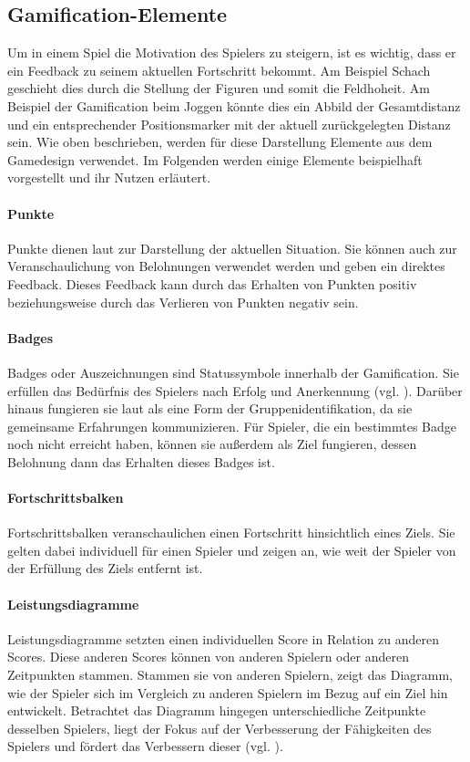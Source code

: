 \documentclass[
	oneside,  %
	ngerman, 
	final, 
	11pt, 
	a4paper, 
	1.1headlines, 
	headinclude=false, 
	footinclude=false, 
	mpinclude=false, 
	pagesize, 
	onecolumn, 
	titlepage, 
	parskip=half, 
	headsepline, 
	chapterprefix=false, 
	version=first, 
	listof=totoc, 
	bibliography=totoc, 
	toc=graduated, 
	fleqn
]{scrbook}
\begin{document}
\subsection{Gamification-Elemente}
\label{Elemente}
Um in einem Spiel die Motivation des Spielers zu steigern, ist es wichtig, dass er ein Feedback zu seinem aktuellen Fortschritt bekommt.
Am Beispiel Schach geschieht dies durch die Stellung der Figuren und somit die Feldhoheit.
Am Beispiel der Gamification beim Joggen könnte dies ein Abbild der Gesamtdistanz und ein entsprechender Positionsmarker mit der aktuell zurückgelegten Distanz sein.
Wie oben beschrieben, werden für diese Darstellung Elemente aus dem Gamedesign verwendet.
Im Folgenden werden einige Elemente beispielhaft vorgestellt und ihr Nutzen erläutert.

\paragraph{Punkte}
Punkte dienen laut \cite{SH2014} zur Darstellung der aktuellen Situation.
Sie können auch zur Veranschaulichung von Belohnungen verwendet werden und geben ein direktes Feedback.
Dieses Feedback kann durch das Erhalten von Punkten positiv beziehungsweise durch das Verlieren von Punkten negativ sein.

\paragraph{Badges}
Badges oder Auszeichnungen sind Statussymbole innerhalb der Gamification.
Sie erfüllen das Bedürfnis des Spielers nach Erfolg und Anerkennung (vgl. \cite{SH2014}).
Darüber hinaus fungieren sie laut \cite{SH2014} als eine Form der Gruppenidentifikation, da sie gemeinsame Erfahrungen kommunizieren.
Für Spieler, die ein bestimmtes Badge noch nicht erreicht haben, können sie außerdem als Ziel fungieren, dessen Belohnung dann das Erhalten dieses Badges ist.

\paragraph{Fortschrittsbalken}
Fortschrittsbalken veranschaulichen einen Fortschritt hinsichtlich eines Ziels.
Sie gelten dabei individuell für einen Spieler und zeigen an, wie weit der Spieler von der Erfüllung des Ziels entfernt ist.

\paragraph{Leistungsdiagramme}
Leistungsdiagramme setzten einen individuellen Score in Relation zu anderen Scores.
Diese anderen Scores können von anderen Spielern oder anderen Zeitpunkten stammen.
Stammen sie von anderen Spielern, zeigt das Diagramm, wie der Spieler sich im Vergleich zu anderen Spielern im Bezug auf ein Ziel hin entwickelt.
Betrachtet das Diagramm hingegen unterschiedliche Zeitpunkte desselben Spielers, liegt der Fokus auf der Verbesserung der Fähigkeiten des Spielers und fördert das Verbessern dieser (vgl. \cite{SH2014}). 
\end{document}
